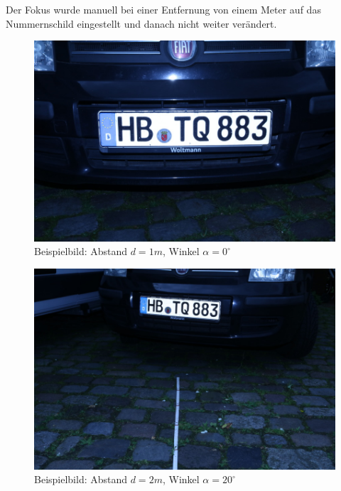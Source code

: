 \documentclass{../Vorlage/sebDenCls}
\begin{document}
Der Fokus wurde manuell bei einer Entfernung von einem Meter auf das Nummernschild eingestellt und danach nicht weiter verändert. 

\begin{figure}[htp]
	\centering 	
	\includegraphics[width=.9\textwidth]{beispielbild} 
	\caption{Beispielbild: Abstand $d=1m$, Winkel $\alpha = 0^\circ$ \label{beispiel}}
\end{figure}

\begin{figure}[htp]
	\centering 	
	\includegraphics[width=.9\textwidth]{beispielbild2} 
	\caption{Beispielbild: Abstand $d=2m$, Winkel $\alpha = 20^\circ$ \label{beispiel2}}
\end{figure}

\section{}
\end{document}
